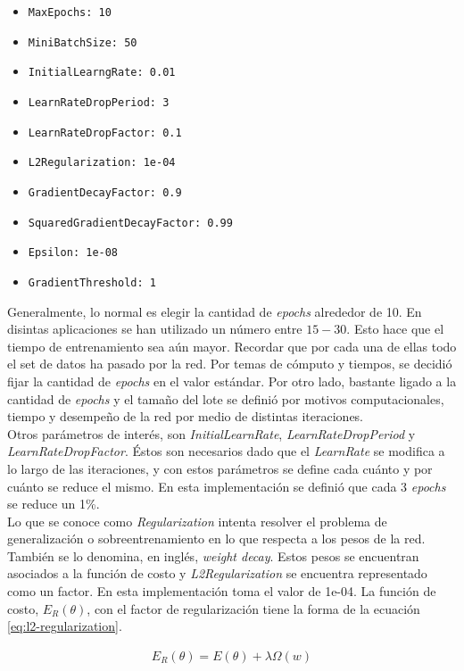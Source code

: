 \begin{itemize}
  \item \texttt{MaxEpochs: 10}
  \item \texttt{MiniBatchSize: 50}
  \item \texttt{InitialLearngRate: 0.01}
  \item \texttt{LearnRateDropPeriod: 3}
  \item \texttt{LearnRateDropFactor: 0.1}
  \item \texttt{L2Regularization: 1e-04}
  \item \texttt{GradientDecayFactor: 0.9}
  \item \texttt{SquaredGradientDecayFactor: 0.99}
  \item \texttt{Epsilon: 1e-08}
  \item \texttt{GradientThreshold: 1}
\end{itemize}

\indent Generalmente, lo normal es elegir la cantidad de \textit{epochs} alrededor de 10. En disintas aplicaciones
se han utilizado un número entre $15-30$. Esto hace que el tiempo de entrenamiento sea aún mayor. Recordar que por
cada una de ellas todo el set de datos ha pasado por la red. Por temas de cómputo y tiempos, se decidió fijar la
cantidad de \textit{epochs} en el valor estándar. Por otro lado, bastante ligado a la cantidad de \textit{epochs} y
el tamaño del lote se definió por motivos computacionales, tiempo y desempeño de la red por medio de distintas
iteraciones. \\
\indent Otros parámetros de interés, son \textit{InitialLearnRate}, \textit{LearnRateDropPeriod} y
\textit{LearnRateDropFactor}. Éstos son necesarios dado que el \textit{LearnRate} se modifica a lo largo de las
iteraciones, y con estos parámetros se define cada cuánto y por cuánto se reduce el mismo. En esta implementación se
definió que cada 3 \textit{epochs} se reduce un 1\%. \\
\indent Lo que se conoce como \textit{Regularization} intenta resolver el problema de generalización o
sobreentrenamiento en lo que respecta a los pesos de la red. También se lo denomina, en inglés, \textit{weight
decay}. Estos pesos se encuentran asociados a la función de costo y \textit{L2Regularization} se encuentra
representado como un factor. En esta implementación toma el valor de 1e-04. La función de costo, $E_R(\theta)$, con
el factor de regularización tiene la forma de la ecuación \ref{eq:l2-regularization}.

\begin{align} \label{eq:l2-regularization}
E_R(\theta) = E(\theta) + \lambda \Omega(w)
\end{align}

